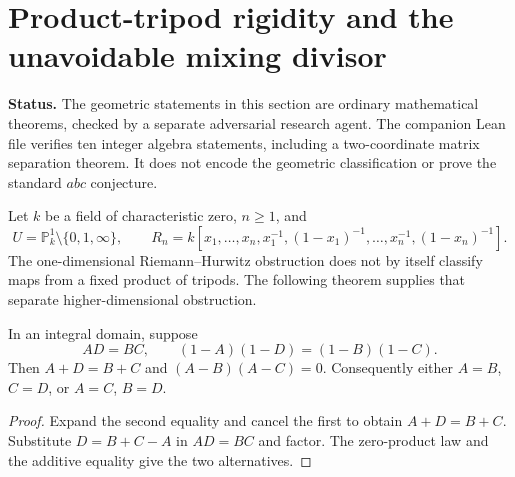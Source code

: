 \section{Product-tripod rigidity and the unavoidable mixing divisor}
\label{pr-section-20260907}
\noindent\textbf{Status.} The geometric statements in this section are ordinary
mathematical theorems, checked by a separate adversarial research agent. The
companion Lean file verifies ten integer algebra statements, including a
two-coordinate matrix separation theorem. It does not encode the geometric
classification or prove the standard $abc$ conjecture.

Let $k$ be a field of characteristic zero, $n\ge1$, and
\[
 U=\mathbb P^1_k\setminus\{0,1,\infty\},\qquad
 R_n=k[x_1,\ldots,x_n,x_1^{-1},(1-x_1)^{-1},\ldots,
 x_n^{-1},(1-x_n)^{-1}].
\]
The one-dimensional Riemann--Hurwitz obstruction does not by itself classify
maps from a fixed product of tripods. The following theorem supplies that
separate higher-dimensional obstruction.

\begin{lemma}
\label{pr-rectangle}
In an integral domain, suppose
\[
 AD=BC,\qquad(1-A)(1-D)=(1-B)(1-C).
\]
Then $A+D=B+C$ and $(A-B)(A-C)=0$. Consequently either $A=B$, $C=D$,
or $A=C$, $B=D$.
\end{lemma}
\begin{proof}
Expand the second equality and cancel the first to obtain $A+D=B+C$.
Substitute $D=B+C-A$ in $AD=BC$ and factor. The zero-product law and
the additive equality give the two alternatives.
\end{proof}

